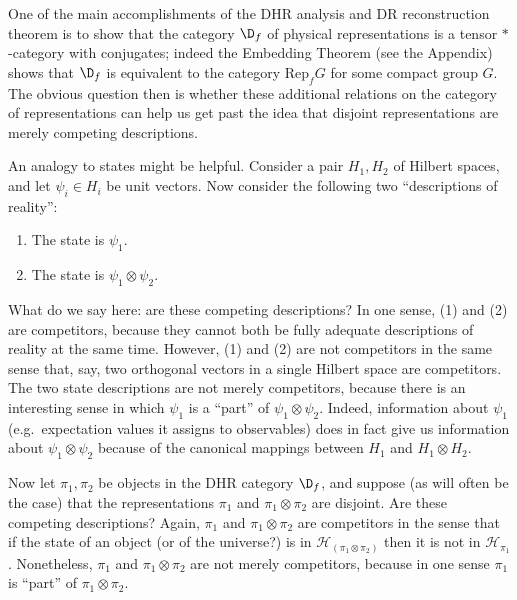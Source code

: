 \documentclass[11pt]{article}
\theoremstyle{definition}
\theoremstyle{definition}
\theoremstyle{remark}
\def\2#1{{\mathcal #1}}
\newcommand{\Rep}{\mathrm{Rep}}
\begin{document}
One of the main accomplishments of the DHR analysis and DR
reconstruction theorem is to show that the category $\D _f$ of
physical representations is a tensor $*$-category with conjugates;
indeed the Embedding Theorem (see the Appendix) shows that $\D _f$ is
equivalent to the category $\Rep _fG$ for some compact group $G$.  The
obvious question then is whether these additional relations on the
category of representations can help us get past the idea that
disjoint representations are merely competing descriptions.

An analogy to states might be helpful.  Consider a pair $H_1,H_2$ of
Hilbert spaces, and let $\psi _i\in H_i$ be unit vectors.  Now
consider the following two ``descriptions of reality'': 
\begin{enumerate}
\item The state is $\psi _1$.
\item The state is $\psi _1\otimes \psi _2$.  
\end{enumerate} 
What do we say here: are these competing descriptions?
In one sense, (1) and (2) are competitors, because they
cannot both be fully adequate descriptions of reality
at the same time.  However, (1) and (2) are not
competitors in the same sense that, say, two orthogonal
vectors in a single Hilbert space are competitors.  The
two state descriptions are not merely competitors,
because there is an interesting sense in which $\psi
_1$ is a ``part'' of $\psi _1\otimes \psi _2$.  Indeed,
information about $\psi _1$ (e.g.\ expectation values
it assigns to observables) does in fact give us
information about $\psi _1\otimes \psi _2$ because of
the canonical mappings between $H_1$ and $H_1\otimes
H_2$.

Now let $\pi _1,\pi _2$ be objects in the DHR category
$\D _f$, and suppose (as will often be the case) that
the representations $\pi _1$ and $\pi _1\otimes \pi _2$
are disjoint.  Are these competing descriptions?
Again, $\pi _1$ and $\pi _1\otimes \pi _2$ are
competitors in the sense that if the state of an object
(or of the universe?) is in $\2H _{(\pi _1\otimes \pi
  _2)}$ then it is not in $\2H _{\pi _1}$.
Nonetheless, $\pi _1$ and $\pi _1\otimes \pi _2$ are
not merely competitors, because in one sense $\pi _1$
is ``part'' of $\pi _1\otimes \pi _2$.
\end{document}
